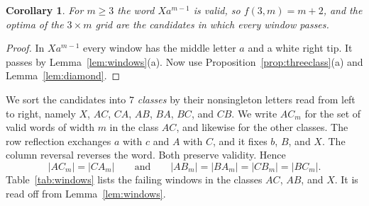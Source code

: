 \documentclass[12pt]{article}
\theoremstyle{plain}
\newtheorem{corollary}[theorem]{Corollary}
\theoremstyle{definition}
\theoremstyle{remark}
\begin{document}
\begin{corollary}\label{cor:threevalue}
For $m\ge3$ the word $Xa^{m-1}$ is valid, so $f(3,m)=m+2$, and the optima of
the $3\times m$ grid are the candidates in which every window passes.
\end{corollary}

\begin{proof}
In $Xa^{m-1}$ every window has the middle letter $a$ and a white right tip.
It passes by Lemma~\ref{lem:windows}(a). Now use
Proposition~\ref{prop:threeclass}(a) and Lemma~\ref{lem:diamond}.
\end{proof}

We sort the candidates into $7$ \emph{classes} by their nonsingleton letters
read from left to right, namely $X$, $AC$, $CA$, $AB$, $BA$, $BC$, and $CB$. We
write $AC_m$ for the set of valid words of width $m$ in the class $AC$, and
likewise for the other classes. The row reflection exchanges $a$ with $c$ and
$A$ with $C$, and it fixes $b$, $B$, and $X$. The column reversal reverses the
word. Both preserve validity. Hence
\begin{equation}\label{eq:classsym}
|AC_m|=|CA_m|\qquad\text{and}\qquad|AB_m|=|BA_m|=|CB_m|=|BC_m| .
\end{equation}
Table~\ref{tab:windows} lists the failing windows in the classes $AC$, $AB$, and
$X$. It is read off from Lemma~\ref{lem:windows}.
\end{document}
